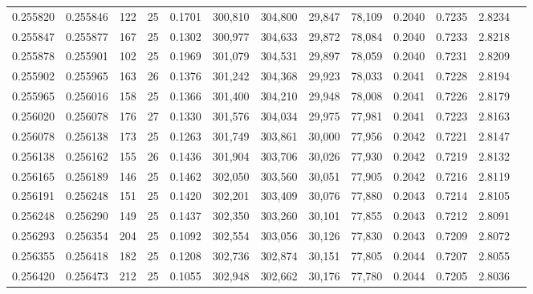\begin{tabular}{rrrrrrrrrrrrr}
0.255820 & 0.255846 &   122 &  25 &                                     0.1701 & 300,810 & 304,800 &  29,847 &  78,109 & 0.2040 & 0.7235 & 2.8234 \\
0.255847 & 0.255877 &   167 &  25 &                                     0.1302 & 300,977 & 304,633 &  29,872 &  78,084 & 0.2040 & 0.7233 & 2.8218 \\
0.255878 & 0.255901 &   102 &  25 &                                     0.1969 & 301,079 & 304,531 &  29,897 &  78,059 & 0.2040 & 0.7231 & 2.8209 \\
0.255902 & 0.255965 &   163 &  26 &                                     0.1376 & 301,242 & 304,368 &  29,923 &  78,033 & 0.2041 & 0.7228 & 2.8194 \\
0.255965 & 0.256016 &   158 &  25 &                                     0.1366 & 301,400 & 304,210 &  29,948 &  78,008 & 0.2041 & 0.7226 & 2.8179 \\
0.256020 & 0.256078 &   176 &  27 &                                     0.1330 & 301,576 & 304,034 &  29,975 &  77,981 & 0.2041 & 0.7223 & 2.8163 \\
0.256078 & 0.256138 &   173 &  25 &                                     0.1263 & 301,749 & 303,861 &  30,000 &  77,956 & 0.2042 & 0.7221 & 2.8147 \\
0.256138 & 0.256162 &   155 &  26 &                                     0.1436 & 301,904 & 303,706 &  30,026 &  77,930 & 0.2042 & 0.7219 & 2.8132 \\
0.256165 & 0.256189 &   146 &  25 &                                     0.1462 & 302,050 & 303,560 &  30,051 &  77,905 & 0.2042 & 0.7216 & 2.8119 \\
0.256191 & 0.256248 &   151 &  25 &                                     0.1420 & 302,201 & 303,409 &  30,076 &  77,880 & 0.2043 & 0.7214 & 2.8105 \\
0.256248 & 0.256290 &   149 &  25 &                                     0.1437 & 302,350 & 303,260 &  30,101 &  77,855 & 0.2043 & 0.7212 & 2.8091 \\
0.256293 & 0.256354 &   204 &  25 &                                     0.1092 & 302,554 & 303,056 &  30,126 &  77,830 & 0.2043 & 0.7209 & 2.8072 \\
0.256355 & 0.256418 &   182 &  25 &                                     0.1208 & 302,736 & 302,874 &  30,151 &  77,805 & 0.2044 & 0.7207 & 2.8055 \\
0.256420 & 0.256473 &   212 &  25 &                                     0.1055 & 302,948 & 302,662 &  30,176 &  77,780 & 0.2044 & 0.7205 & 2.8036 \\

\end{tabular}
